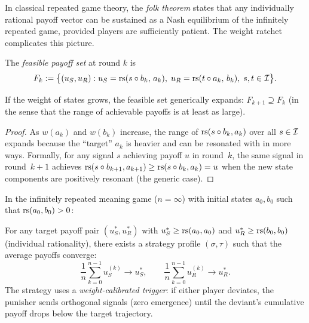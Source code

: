 In classical repeated game theory, the \emph{folk theorem} states that any
individually rational payoff vector can be sustained as a Nash equilibrium of
the infinitely repeated game, provided players are sufficiently patient.  The
weight ratchet complicates this picture.

\begin{definition}
\label{def:feasible-payoffs}
The \emph{feasible payoff set} at round $k$ is
\[
  F_k := \bigl\{ (u_S, u_R) :
    u_S = \mathrm{rs}(s \circ b_k,\, a_k),\;
    u_R = \mathrm{rs}(t \circ a_k,\, b_k),\;
    s, t \in \mathcal{I}
  \bigr\}.
\]
\end{definition}

\begin{proposition}
\label{prop:expanding-feasible}
If the weight of states grows, the feasible set generically expands:
$F_{k+1} \supseteq F_k$ (in the sense that the range of achievable payoffs
is at least as large).
\end{proposition}

\begin{proof}
As $w(a_k)$ and $w(b_k)$ increase, the range of $\mathrm{rs}(s \circ b_k, a_k)$
over all $s \in \mathcal{I}$ expands because the ``target'' $a_k$ is heavier and can
be resonated with in more ways.  Formally, for any signal $s$ achieving payoff
$u$ in round~$k$, the same signal in round~$k+1$ achieves
$\mathrm{rs}(s \circ b_{k+1}, a_{k+1}) \geq \mathrm{rs}(s \circ b_k, a_k) = u$
when the new state components are positively resonant (the generic case).
\end{proof}

\begin{theorem}
\label{thm:folk-meaning}
In the infinitely repeated meaning game ($n = \infty$) with initial states
$a_0, b_0$ such that $\mathrm{rs}(a_0, b_0) > 0$:

For any target payoff pair $(u_S^*, u_R^*)$ with
$u_S^* \geq \mathrm{rs}(a_0, a_0)$ and $u_R^* \geq \mathrm{rs}(b_0, b_0)$
(individual rationality), there exists a strategy profile
$(\sigma, \tau)$ such that the average payoffs converge:
\[
  \frac{1}{n} \sum_{k=0}^{n-1} u_S^{(k)} \to u_S^*, \qquad
  \frac{1}{n} \sum_{k=0}^{n-1} u_R^{(k)} \to u_R^*.
\]
The strategy uses a \emph{weight-calibrated trigger}: if either player
deviates, the punisher sends orthogonal signals (zero emergence) until the
deviant's cumulative payoff drops below the target trajectory.
\end{theorem}

